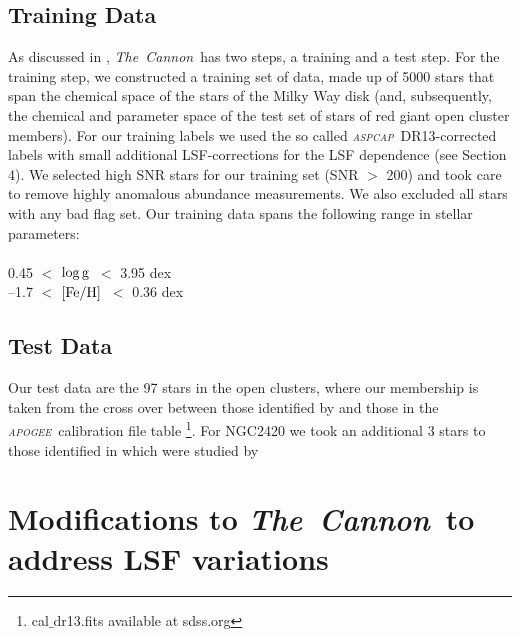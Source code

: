 \documentclass[14pt, preprint2]{aastex6}
\newcommand{\project}[1]{\textsl{#1}}
\newcommand{\tc}{\project{The~Cannon}}
\newcommand{\apogee}{\project{\textsc{apogee}}}
\newcommand{\aspcap}{\project{\textsc{aspcap}}}
\newcommand{\teff}{\mbox{$\rm T_{eff}$}}
\newcommand{\feh}{\mbox{$\rm [Fe/H]$}}
\newcommand{\logg}{\mbox{$\rm \log g$}}
\begin{document}
\subsection{Training Data} 

As discussed in \citet{Ness2015}, \tc\ has two steps, a training and a test step. For the training step, we constructed a training set of data, made up of 5000 stars that span the chemical space of the stars of the Milky Way disk (and, subsequently, the chemical and parameter space of the  test set of stars of red giant open cluster members).  For our training labels we used the so called \aspcap\ DR13-corrected labels with small additional LSF-corrections for the LSF dependence (see Section 4). We selected high SNR stars for our training set (SNR $>$ 200) and took care to remove highly anomalous abundance measurements. We also excluded all stars with any bad flag set.  Our training data spans the following range in stellar parameters:\\

\noindent{ 3650 $<$ \teff\ $<$ 5760 K } \\
 0.45 $<$  \logg\ $<$ 3.95 dex \\
--1.7 $<$ \feh\ $<$ 0.36 dex \\

\subsection{Test Data} 

Our test data are the 97 stars in the open clusters, where our membership is taken from the cross over between those identified by \citet{Meszaros2013} and those in the \apogee\ calibration file table \footnote{cal$\_$dr13.fits available at sdss.org}. For NGC2420 we took an additional 3 stars to those identified in \citet{Meszaros2013}  which were studied by \citet{Souto2016}

\section{Modifications to \tc\ to address LSF variations}
\end{document}
